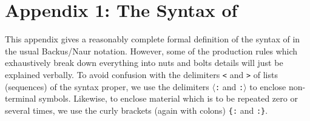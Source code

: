\section*{Appendix 1: The Syntax of \kir}
This appendix gives a reasonably complete formal definition of the
 {\mys syntax} of \kir in the usual Backus/Naur notation. However,
 some of the production rules which exhaustively break down everything into nuts and bolts details will just be explained verbally.
To avoid confusion with the delimiters {\tt <} and {\tt >} of lists
 (sequences) of the syntax proper,
we use the delimiters {\tt $\langle$:} and {\tt :$\rangle$} 
to enclose non-terminal symbols. Likewise, to enclose material
which is to be repeated zero or several times, we use 
the curly brackets (again with colons) {\tt \{:} and
{\tt :\}}.

